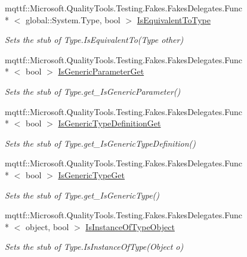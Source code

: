\begin{DoxyCompactItemize}
mqttf\-::\-Microsoft.\-Quality\-Tools.\-Testing.\-Fakes.\-Fakes\-Delegates.\-Func\\*
$<$ global\-::\-System.\-Type, bool $>$ \hyperlink{class_system_1_1_fakes_1_1_stub_type_a42a04b8fc401d580628b74455546fa9d}{Is\-Equivalent\-To\-Type}
\begin{DoxyCompactList}\small\item\em Sets the stub of Type.\-Is\-Equivalent\-To(\-Type other)\end{DoxyCompactList}\item 
mqttf\-::\-Microsoft.\-Quality\-Tools.\-Testing.\-Fakes.\-Fakes\-Delegates.\-Func\\*
$<$ bool $>$ \hyperlink{class_system_1_1_fakes_1_1_stub_type_aadc0de58c8ac5accd4e4cf1baf2b6608}{Is\-Generic\-Parameter\-Get}
\begin{DoxyCompactList}\small\item\em Sets the stub of Type.\-get\-\_\-\-Is\-Generic\-Parameter()\end{DoxyCompactList}\item 
mqttf\-::\-Microsoft.\-Quality\-Tools.\-Testing.\-Fakes.\-Fakes\-Delegates.\-Func\\*
$<$ bool $>$ \hyperlink{class_system_1_1_fakes_1_1_stub_type_afd91c14843317d6b6c0dc3d4ced2c307}{Is\-Generic\-Type\-Definition\-Get}
\begin{DoxyCompactList}\small\item\em Sets the stub of Type.\-get\-\_\-\-Is\-Generic\-Type\-Definition()\end{DoxyCompactList}\item 
mqttf\-::\-Microsoft.\-Quality\-Tools.\-Testing.\-Fakes.\-Fakes\-Delegates.\-Func\\*
$<$ bool $>$ \hyperlink{class_system_1_1_fakes_1_1_stub_type_a0be3601a91cc57e566feb9cade4a2999}{Is\-Generic\-Type\-Get}
\begin{DoxyCompactList}\small\item\em Sets the stub of Type.\-get\-\_\-\-Is\-Generic\-Type()\end{DoxyCompactList}\item 
mqttf\-::\-Microsoft.\-Quality\-Tools.\-Testing.\-Fakes.\-Fakes\-Delegates.\-Func\\*
$<$ object, bool $>$ \hyperlink{class_system_1_1_fakes_1_1_stub_type_abb378515dd5acf3013b7ca78b4ebe9a7}{Is\-Instance\-Of\-Type\-Object}
\begin{DoxyCompactList}\small\item\em Sets the stub of Type.\-Is\-Instance\-Of\-Type(\-Object o)\end{DoxyCompactList}\item 

\end{DoxyCompactItemize}
